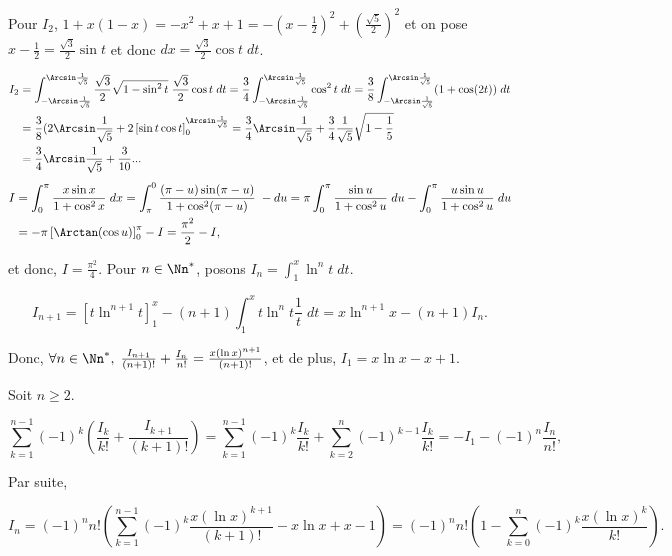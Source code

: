 {{Pour $I_2$, $1+x(1-x)=-x^2+x+1=-(x-\frac{1}{2})^2+(\frac{\sqrt{5}}{2})^2$ et on pose $x-\frac{1}{2}=\frac{\sqrt{3}}{2}\sin t$ et donc $dx=\frac{\sqrt{3}}{2}\cos t\;dt$.

\begin{align*}\ensuremath
I_2&=\int_{-\Arcsin\frac{1}{\sqrt{5}}}^{\Arcsin\frac{1}{\sqrt{5}}}\frac{\sqrt{3}}{2}\sqrt{1-\sin^2t}\;\frac{\sqrt{3}}{2}\cos t\;dt=
\frac{3}{4}\int_{-\Arcsin\frac{1}{\sqrt{5}}}^{\Arcsin\frac{1}{\sqrt{5}}}\cos^2t\;dt
=\frac{3}{8}\int_{-\Arcsin\frac{1}{\sqrt{5}}}^{\Arcsin\frac{1}{\sqrt{5}}}(1+\cos(2t))\;dt\\
 &=\frac{3}{8}(2\Arcsin\frac{1}{\sqrt{5}}+2\left[\sin t\cos t\right]_{0}^{\Arcsin\frac{1}{\sqrt{5}}}
 =\frac{3}{4}\Arcsin\frac{1}{\sqrt{5}}+\frac{3}{4}\frac{1}{\sqrt{5}}\sqrt{1-\frac{1}{5}}\\
 &=\frac{3}{4}\Arcsin\frac{1}{\sqrt{5}}+\frac{3}{10}...
\end{align*}
\begin{align*}\ensuremath
I&=\int_{0}^{\pi}\frac{x\sin x}{1+\cos^2x}\;dx=\int_{\pi}^{0}\frac{(\pi-u)\sin(\pi-u)}{1+\cos^2(\pi-u)}\;-du
=\pi\int_{0}^{\pi}\frac{\sin u}{1+\cos^2u}\;du-\int_{0}^{\pi}\frac{u\sin u}{1+\cos^2u}\;du\\
 &=-\pi\left[\Arctan(\cos u)\right]_{0}^{\pi}-I=\frac{\pi^2}{2}-I,
\end{align*}

et donc, $I=\frac{\pi^2}{4}$.
Pour $n\in\Nn^*$, posons $I_n=\int_{1}^{x}\ln^nt\;dt$.

$$I_{n+1}=\left[t\ln^{n+1}t\right]_{1}^{x}-(n+1)\int_{1}^{x}t\ln^nt\frac{1}{t}\;dt=x\ln^{n+1}x-(n+1)I_n.$$

Donc, $\forall n\in\Nn^*,\;\frac{I_{n+1}}{(n+1)!}+\frac{I_n}{n!}=\frac{x(\ln x)^{n+1}}{(n+1)!}$, et de plus, $I_1=x\ln x-x+1$.

Soit $n\geq2$.

$$\sum_{k=1}^{n-1}(-1)^k(\frac{I_k}{k!}+\frac{I_{k+1}}{(k+1)!})=\sum_{k=1}^{n-1}(-1)^k\frac{I_k}{k!}+\sum_{k=2}^{n}(-1)^{k-1}\frac{I_k}{k!}=-I_1-(-1)^n\frac{I_n}{n!},$$

Par suite,

$$I_n=(-1)^nn!(\sum_{k=1}^{n-1}(-1)^k\frac{x(\ln x)^{k+1}}{(k+1)!}-x\ln x+x-1)=(-1)^nn!(1-\sum_{k=0}^{n}(-1)^{k}\frac{x(\ln x)^{k}}{k!}).$$
}
}
